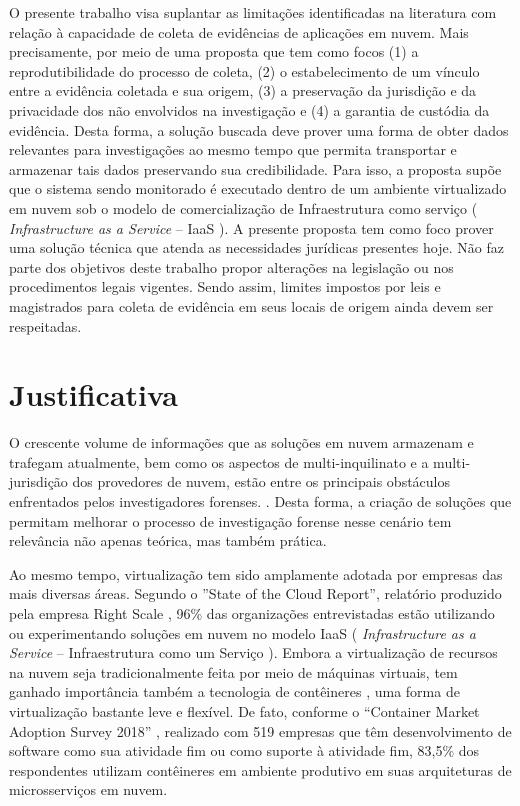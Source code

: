 %
O presente trabalho visa suplantar as limitações identificadas na literatura com relação à capacidade de coleta de evidências de aplicações em nuvem.
%
Mais precisamente, por meio de uma proposta que tem como focos (1) a reprodutibilidade do processo de coleta, (2) o estabelecimento de um vínculo entre a evidência coletada e sua origem, (3) a preservação da jurisdição e da privacidade dos não envolvidos na investigação e (4) a garantia de custódia da evidência.
%
Desta forma, a solução buscada deve prover uma forma de obter dados relevantes para investigações ao mesmo tempo que permita transportar e armazenar tais dados preservando sua credibilidade.
%
Para isso, a proposta supõe que o sistema sendo monitorado é executado dentro de um ambiente virtualizado em nuvem sob o modelo de comercialização de Infraestrutura como serviço ( \textit{Infrastructure as a Service} -- IaaS ).
%
A presente proposta tem como foco prover uma solução técnica que atenda as necessidades jurídicas presentes hoje. 
%
Não faz parte dos objetivos deste trabalho propor alterações na legislação ou nos procedimentos legais vigentes.
%
Sendo assim, limites impostos por leis e magistrados para coleta de evidência em seus locais de origem ainda devem ser respeitadas.


\section{Justificativa}
\label{sec:intro-justificativa}

O crescente volume de informações que as soluções em nuvem armazenam e trafegam atualmente, bem como os aspectos de multi-inquilinato e a multi-jurisdição dos provedores de nuvem, estão entre os principais obstáculos enfrentados pelos investigadores forenses. \cite{QuickIncreaseVolumeImpact:2014} \cite{BashAdvInForensics:2015}.
%
Desta forma, a criação de soluções que permitam melhorar o processo de investigação forense nesse cenário tem relevância não apenas teórica, mas também prática.


Ao mesmo tempo, virtualização tem sido amplamente adotada por empresas das mais diversas áreas. 
%
Segundo o ''State of the Cloud Report'', relatório produzido pela empresa Right Scale \cite{RightScale2018}, 96\% das organizações entrevistadas estão utilizando ou experimentando soluções em nuvem no modelo IaaS ( \textit{Infrastructure as a Service} -- Infraestrutura como um Serviço ).
%
Embora a virtualização de recursos na nuvem seja tradicionalmente feita por meio de máquinas virtuais, tem ganhado importância também a tecnologia de contêineres \cite{Diamanti2019}, uma forma de virtualização bastante leve e flexível.
%
De fato, conforme o ``Container Market Adoption Survey 2018'' \cite{Portworx2018}, realizado com 519 empresas que têm desenvolvimento de software como sua atividade fim ou como suporte à atividade fim, 83,5\% dos respondentes utilizam contêineres em ambiente produtivo em suas arquiteturas de microsserviços em nuvem.
%

